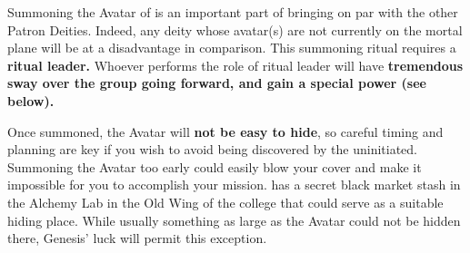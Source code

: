 \documentclass[green]{GL2020}
\begin{document}
\name{\gGenesisAvatar{}}

Summoning the Avatar of \cGenesis{} is an important part of bringing \cGenesis{} on par with the other Patron Deities. Indeed, any deity whose avatar(s) are not currently on the mortal plane will be at a disadvantage in comparison. This summoning ritual requires a \textbf{ritual leader.} Whoever performs the role of ritual leader will have \textbf{tremendous sway over the group going forward, and gain a special power (see below).} 

Once summoned, the Avatar will \textbf{not be easy to hide}, so careful timing and planning are key if you wish to avoid being discovered by the uninitiated. Summoning the Avatar too early could easily blow your cover and make it impossible for you to accomplish your mission.  \cChupInventor{\full} has a secret black market stash in the Alchemy Lab in the Old Wing of the college that could serve as a suitable hiding place. While usually something as large as the Avatar could not be hidden there, Genesis’ luck will permit this exception. 
\end{document}
